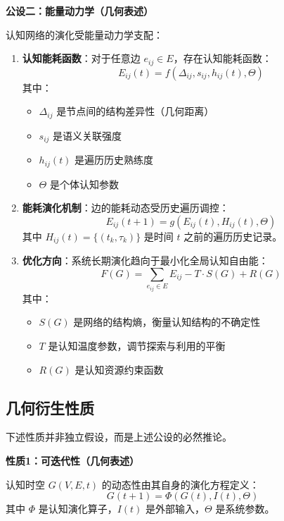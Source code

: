 \documentclass[12pt,a4paper]{article}
\begin{document}
\textbf{公设二：能量动力学（几何表述）}

认知网络的演化受能量动力学支配：

\begin{enumerate}
\item \textbf{认知能耗函数}：对于任意边 $e_{ij} \in E$，存在认知能耗函数：
\begin{equation}
E_{ij}(t) = f(\Delta_{ij}, s_{ij}, h_{ij}(t), \Theta)
\end{equation}
其中：
\begin{itemize}
\item $\Delta_{ij}$ 是节点间的结构差异性（几何距离）
\item $s_{ij}$ 是语义关联强度
\item $h_{ij}(t)$ 是遍历历史熟练度
\item $\Theta$ 是个体认知参数
\end{itemize}

\item \textbf{能耗演化机制}：边的能耗动态受历史遍历调控：
\begin{equation}
E_{ij}(t+1) = g(E_{ij}(t), H_{ij}(t), \Theta)
\end{equation}
其中 $H_{ij}(t) = \{(t_k, \tau_k)\}$ 是时间 $t$ 之前的遍历历史记录。

\item \textbf{优化方向}：系统长期演化趋向于最小化全局认知自由能：
\begin{equation}
F(G) = \sum_{e_{ij} \in E} E_{ij} - T \cdot S(G) + R(G)
\end{equation}
其中：
\begin{itemize}
\item $S(G)$ 是网络的结构熵，衡量认知结构的不确定性
\item $T$ 是认知温度参数，调节探索与利用的平衡
\item $R(G)$ 是认知资源约束函数
\end{itemize}
\end{enumerate}

\subsection{几何衍生性质}

下述性质并非独立假设，而是上述公设的必然推论。

\textbf{性质1：可迭代性（几何表述）}

认知时空 $G(V,E,t)$ 的动态性由其自身的演化方程定义：
\begin{equation}
G(t+1) = \Phi(G(t), I(t), \Theta)
\end{equation}
其中 $\Phi$ 是认知演化算子，$I(t)$ 是外部输入，$\Theta$ 是系统参数。
\end{document}
